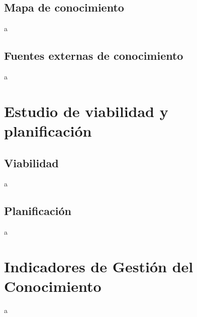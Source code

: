 \documentclass[a4paper]{article}
\begin{document}
\subsection{Mapa de conocimiento}

a

\subsection{Fuentes externas de conocimiento}

a


\section{Estudio de viabilidad y planificación}

\subsection{Viabilidad}

a

\subsection{Planificación}

a

\section{Indicadores de Gestión del Conocimiento}

a
\end{document}
